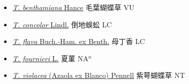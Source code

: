 \begin{itemize}
  \begin{itemize}
        \item[] \href{http://www.theplantlist.org/tpl1.1/search?q=Torenia+benthamiana}{\textit{T. benthamiana} Hance}   毛葉蝴蝶草 VU
        \item[] \href{http://www.theplantlist.org/tpl1.1/search?q=Torenia+concolor}{\textit{T. concolor} Lindl.}   倒地蜈蚣 LC
        \item[] \href{http://www.theplantlist.org/tpl1.1/search?q=Torenia+flava}{\textit{T. flava} Buch.-Ham. ex Benth.}   母丁香 LC
        \item[] \href{http://www.theplantlist.org/tpl1.1/search?q=Torenia+fournieri}{\textit{T. fournieri} L.}   夏菫 NA$^n$
        \item[] \href{http://www.theplantlist.org/tpl1.1/search?q=Torenia+violacea}{\textit{T. violacea} (Azaola ex Blanco) Pennell}   紫萼蝴蝶草 NT
  \end{itemize}
  \end{itemize}
